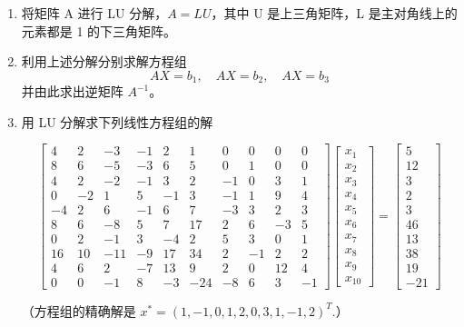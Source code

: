 \begin{enumerate}
    \item 将矩阵 A 进行 LU 分解，$A = LU$，其中 U 是上三角矩阵，L 是主对角线上的元素都是 1 的下三角矩阵。
    \item 利用上述分解分别求解方程组
\[ AX = b_1, \quad AX = b_2, \quad AX = b_3 \]
并由此求出逆矩阵 $A^{-1}$。
    \item 用 LU 分解求下列线性方程组的解


\[
\begin{bmatrix}
4 & 2 & -3 & -1 & 2 & 1 & 0 & 0 & 0 & 0  \\
8 & 6 & -5 & -3 & 6 & 5 & 0 & 1 & 0 & 0  \\
4 & 2 & -2 & -1 & 3 & 2 & -1 & 0 & 3 & 1 \\
0 & -2 & 1 & 5 & -1 & 3 & -1 & 1 & 9 & 4 \\
-4 & 2 & 6 & -1 & 6 & 7 & -3 & 3 & 2 & 3 \\
8 & 6 & -8 & 5 & 7 & 17 & 2 & 6 & -3 & 5 \\
0 & 2 & -1 & 3 & -4 & 2 & 5 & 3 & 0 & 1 \\
16 & 10 & -11 & -9 & 17 & 34 & 2 & -1 & 2 & 2 \\
4 & 6 & 2 & -7 & 13 & 9 & 2 & 0 & 12 & 4 \\
0 & 0 & -1 & 8 & -3 & -24 & -8 & 6 & 3 & -1 
\end{bmatrix}
\begin{bmatrix}
x_1 \\
x_2 \\
x_3 \\
x_4 \\
x_5 \\
x_6 \\
x_7 \\
x_8 \\
x_9 \\
x_{10}
\end{bmatrix}
=
\begin{bmatrix}
5 \\
12 \\
3 \\
2 \\
3 \\
46 \\
13 \\
38 \\
19 \\
-21
\end{bmatrix}
\]

（方程组的精确解是 $x^* = (1, -1, 0, 1, 2, 0, 3, 1, -1, 2)^T$.）
\end{enumerate}

